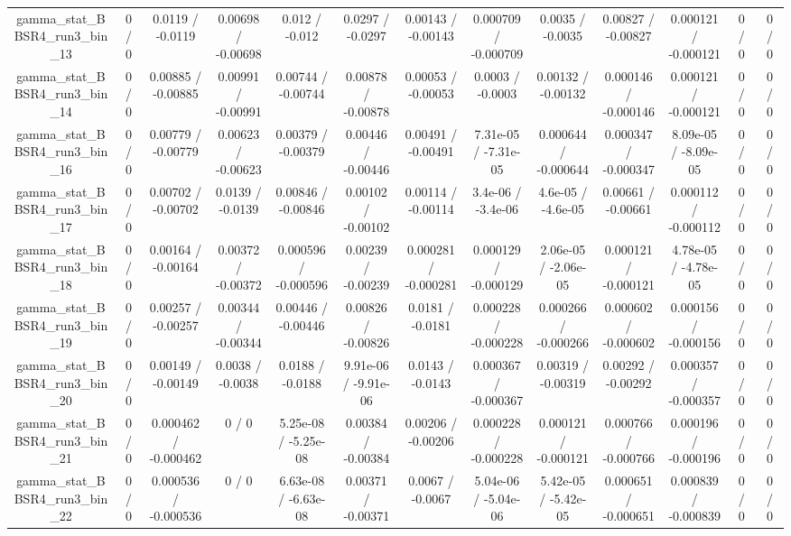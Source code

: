 \documentclass[10pt]{article}
\begin{document}
\begin{table}[htbp]
\begin{center}
\begin{tabular}{|c|c|c|c|c|c|c|c|c|c|c|c|c|}
  gamma_stat_BBSR4_run3_bin_13 & 0 / 0 & 0.0119 / -0.0119 & 0.00698 / -0.00698 & 0.012 / -0.012 & 0.0297 / -0.0297 & 0.00143 / -0.00143 & 0.000709 / -0.000709 & 0.0035 / -0.0035 & 0.00827 / -0.00827 & 0.000121 / -0.000121 & 0 / 0 & 0 / 0 \\ 
  gamma_stat_BBSR4_run3_bin_14 & 0 / 0 & 0.00885 / -0.00885 & 0.00991 / -0.00991 & 0.00744 / -0.00744 & 0.00878 / -0.00878 & 0.00053 / -0.00053 & 0.0003 / -0.0003 & 0.00132 / -0.00132 & 0.000146 / -0.000146 & 0.000121 / -0.000121 & 0 / 0 & 0 / 0 \\ 
  gamma_stat_BBSR4_run3_bin_16 & 0 / 0 & 0.00779 / -0.00779 & 0.00623 / -0.00623 & 0.00379 / -0.00379 & 0.00446 / -0.00446 & 0.00491 / -0.00491 & 7.31e-05 / -7.31e-05 & 0.000644 / -0.000644 & 0.000347 / -0.000347 & 8.09e-05 / -8.09e-05 & 0 / 0 & 0 / 0 \\ 
  gamma_stat_BBSR4_run3_bin_17 & 0 / 0 & 0.00702 / -0.00702 & 0.0139 / -0.0139 & 0.00846 / -0.00846 & 0.00102 / -0.00102 & 0.00114 / -0.00114 & 3.4e-06 / -3.4e-06 & 4.6e-05 / -4.6e-05 & 0.00661 / -0.00661 & 0.000112 / -0.000112 & 0 / 0 & 0 / 0 \\ 
  gamma_stat_BBSR4_run3_bin_18 & 0 / 0 & 0.00164 / -0.00164 & 0.00372 / -0.00372 & 0.000596 / -0.000596 & 0.00239 / -0.00239 & 0.000281 / -0.000281 & 0.000129 / -0.000129 & 2.06e-05 / -2.06e-05 & 0.000121 / -0.000121 & 4.78e-05 / -4.78e-05 & 0 / 0 & 0 / 0 \\ 
  gamma_stat_BBSR4_run3_bin_19 & 0 / 0 & 0.00257 / -0.00257 & 0.00344 / -0.00344 & 0.00446 / -0.00446 & 0.00826 / -0.00826 & 0.0181 / -0.0181 & 0.000228 / -0.000228 & 0.000266 / -0.000266 & 0.000602 / -0.000602 & 0.000156 / -0.000156 & 0 / 0 & 0 / 0 \\ 
  gamma_stat_BBSR4_run3_bin_20 & 0 / 0 & 0.00149 / -0.00149 & 0.0038 / -0.0038 & 0.0188 / -0.0188 & 9.91e-06 / -9.91e-06 & 0.0143 / -0.0143 & 0.000367 / -0.000367 & 0.00319 / -0.00319 & 0.00292 / -0.00292 & 0.000357 / -0.000357 & 0 / 0 & 0 / 0 \\ 
  gamma_stat_BBSR4_run3_bin_21 & 0 / 0 & 0.000462 / -0.000462 & 0 / 0 & 5.25e-08 / -5.25e-08 & 0.00384 / -0.00384 & 0.00206 / -0.00206 & 0.000228 / -0.000228 & 0.000121 / -0.000121 & 0.000766 / -0.000766 & 0.000196 / -0.000196 & 0 / 0 & 0 / 0 \\ 
  gamma_stat_BBSR4_run3_bin_22 & 0 / 0 & 0.000536 / -0.000536 & 0 / 0 & 6.63e-08 / -6.63e-08 & 0.00371 / -0.00371 & 0.0067 / -0.0067 & 5.04e-06 / -5.04e-06 & 5.42e-05 / -5.42e-05 & 0.000651 / -0.000651 & 0.000839 / -0.000839 & 0 / 0 & 0 / 0 \\ 

\end{tabular}
\end{center}
\end{table}
\end{document}
